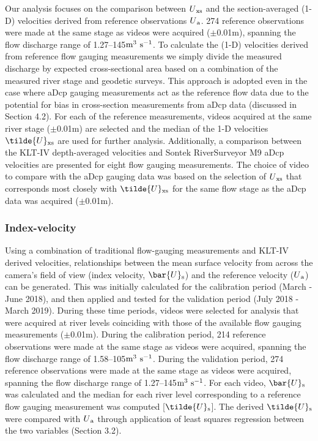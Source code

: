 \documentclass[hess, manuscript]{copernicus} %
\begin{document}
Our analysis focuses on the comparison between ${U}\textsubscript{xs}$ and the section-averaged (1-D) velocities derived from reference observations $U\textsubscript{a}$. 274 reference observations were made at the same stage as videos were acquired ($\pm$0.01m), spanning the flow discharge range of 1.27--145$\textnormal{m\textsuperscript{3} s\textsuperscript{-1}}$. To calculate the (1-D) velocities derived from reference flow gauging measurements we simply divide the measured discharge by expected cross-sectional area based on a combination of the measured river stage and geodetic surveys. This approach is adopted even in the case where aDcp gauging measurements act as the reference flow data due to the potential for bias in cross-section measurements from aDcp data (discussed in Section 4.2). For each of the reference measurements, videos acquired at the same river stage ($\pm$0.01m) are selected and the median of the 1-D velocities $\tilde{U}\textsubscript{xs}$ are used for further analysis. Additionally, a comparison between the KLT-IV depth-averaged velocities and Sontek RiverSurveyor M9 aDcp velocities are presented for eight flow gauging measurements. The choice of video to compare with the aDcp gauging data was based on the selection of ${U}\textsubscript{xs}$ that corresponds most closely with $\tilde{U}\textsubscript{xs}$ for the same flow stage as the aDcp data was acquired ($\pm$0.01m).


\subsubsection{Index-velocity} \label{Index-velocity}
Using a combination of traditional flow-gauging measurements and KLT-IV derived velocities, relationships between the mean surface velocity from across the camera's field of view (index velocity, $\bar{U}\textsubscript{s}$) and the reference velocity ($U\textsubscript{a}$) can be generated. This was initially calculated for the calibration period (March - June 2018), and then applied and tested for the validation period (July 2018 - March 2019). During these time periods, videos were selected for analysis that were acquired at river levels coinciding with those of the available flow gauging measurements ($\pm$0.01m). During the calibration period, 214 reference observations were made at the same stage as videos were acquired, spanning the flow discharge range of 1.58--105$\textnormal{m\textsuperscript{3} s\textsuperscript{-1}}$. During the validation period, 274 reference observations were made at the same stage as videos were acquired, spanning the flow discharge range of 1.27--145$\textnormal{m\textsuperscript{3} s\textsuperscript{-1}}$. For each video, $\bar{U}\textsubscript{s}$ was calculated and the median for each river level corresponding to a reference flow gauging measurement was computed [$\tilde{U}\textsubscript{s}$]. The derived $\tilde{U}\textsubscript{s}$ were compared with $U\textsubscript{a}$ through application of least squares regression between the two variables (Section 3.2).
\end{document}
